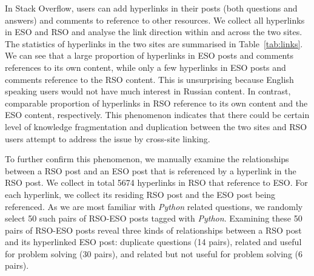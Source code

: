 In Stack Overflow, users can add hyperlinks in their posts (both questions and answers) and comments to reference to other resources. 
We collect all hyperlinks in ESO and RSO and analyse the link direction within and across the two sites.
The statistics of hyperlinks in the two sites are summarised in Table~\ref{tab:links}.
We can see that a large proportion of hyperlinks in ESO posts and comments references to its own content, while only a few hyperlinks in ESO posts and comments reference to the RSO content.
This is unsurprising because English speaking users would not have much interest in Russian content.
In contrast, comparable proportion of hyperlinks in RSO reference to its own content and the ESO content, respectively.
This phenomenon indicates that there could be certain level of knowledge fragmentation and duplication between the two sites and RSO users attempt to address the issue by cross-site linking.

To further confirm this phenomenon, we manually examine the relationships between a RSO post and an ESO post that is referenced by a hyperlink in the RSO post.
We collect in total 5674 hyperlinks in RSO that reference to ESO.
For each hyperlink, we collect its residing RSO post and the ESO post being referenced.
As we are most familiar with \textit{Python} related questions, we randomly select 50 such pairs of RSO-ESO posts tagged with \textit{Python}.
Examining these 50 pairs of RSO-ESO posts reveal three kinds of relationships between a RSO post and its hyperlinked ESO post: 
duplicate questions (14 pairs), 
related and useful for problem solving (30 pairs), 
and related but not useful for problem solving (6 pairs).

